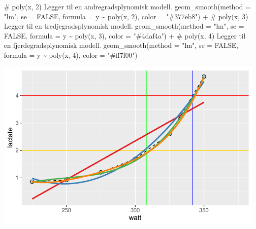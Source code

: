 \documentclass[
  letterpaper,
  DIV=11,
  numbers=noendperiod]{scrartcl}
\newenvironment{Shaded}{\begin{snugshade}}{\end{snugshade}}
\newcommand{\AttributeTok}[1]{\textcolor[rgb]{0.40,0.45,0.13}{#1}}
\newcommand{\CommentTok}[1]{\textcolor[rgb]{0.37,0.37,0.37}{#1}}
\newcommand{\ConstantTok}[1]{\textcolor[rgb]{0.56,0.35,0.01}{#1}}
\newcommand{\DecValTok}[1]{\textcolor[rgb]{0.68,0.00,0.00}{#1}}
\newcommand{\FunctionTok}[1]{\textcolor[rgb]{0.28,0.35,0.67}{#1}}
\newcommand{\NormalTok}[1]{\textcolor[rgb]{0.00,0.23,0.31}{#1}}
\newcommand{\SpecialCharTok}[1]{\textcolor[rgb]{0.37,0.37,0.37}{#1}}
\newcommand{\StringTok}[1]{\textcolor[rgb]{0.13,0.47,0.30}{#1}}
\begin{document}
\begin{Shaded}
\begin{Highlighting}[]
  \CommentTok{\# poly(x, 2) Legger til en andregradsplynomisk modell.}
  \FunctionTok{geom\_smooth}\NormalTok{(}\AttributeTok{method =} \StringTok{"lm"}\NormalTok{, }\AttributeTok{se =} \ConstantTok{FALSE}\NormalTok{, }\AttributeTok{formula =}\NormalTok{ y }\SpecialCharTok{\textasciitilde{}} \FunctionTok{poly}\NormalTok{(x, }\DecValTok{2}\NormalTok{), }\AttributeTok{color =} \StringTok{"\#377eb8"}\NormalTok{) }\SpecialCharTok{+}
  \CommentTok{\# poly(x, 3) Legger til en tredjegradsplynomisk modell.}
  \FunctionTok{geom\_smooth}\NormalTok{(}\AttributeTok{method =} \StringTok{"lm"}\NormalTok{, }\AttributeTok{se =} \ConstantTok{FALSE}\NormalTok{, }\AttributeTok{formula =}\NormalTok{ y }\SpecialCharTok{\textasciitilde{}} \FunctionTok{poly}\NormalTok{(x, }\DecValTok{3}\NormalTok{), }\AttributeTok{color =} \StringTok{"\#4daf4a"}\NormalTok{) }\SpecialCharTok{+}
  \CommentTok{\# poly(x, 4) Legger til en fjerdegradsplynomisk modell.}
  \FunctionTok{geom\_smooth}\NormalTok{(}\AttributeTok{method =} \StringTok{"lm"}\NormalTok{, }\AttributeTok{se =} \ConstantTok{FALSE}\NormalTok{, }\AttributeTok{formula =}\NormalTok{ y }\SpecialCharTok{\textasciitilde{}} \FunctionTok{poly}\NormalTok{(x, }\DecValTok{4}\NormalTok{), }\AttributeTok{color =} \StringTok{"\#ff7f00"}\NormalTok{)}
\end{Highlighting}
\end{Shaded}

\includegraphics{02-regression-models_files/figure-pdf/unnamed-chunk-1-1.pdf}
\end{document}
